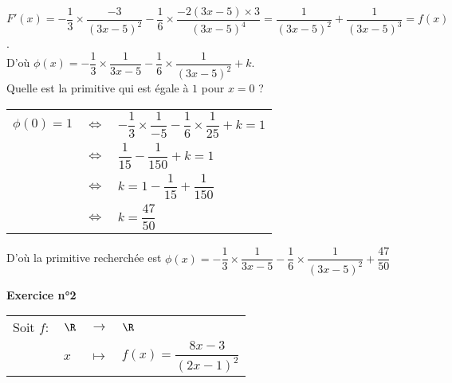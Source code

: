 $F'(x) = -\dfrac{1}{3} \times \dfrac{-3}{\left(3x-5\right)^2} - \dfrac{1}{6} \times \dfrac{-2\left(3x-5\right) \times 3}{\left(3x-5\right)^4} = \dfrac{1}{\left(3x-5\right)^2} + \dfrac{1}{\left(3x-5\right)^3} = f(x)$. \vspace*{.3cm} \\

D'où $\phi\left(x\right) = -\dfrac{1}{3} \times \dfrac{1}{3x-5} - \dfrac{1}{6} \times \dfrac{1}{\left(3x-5\right)^2} + k$. \vspace*{.3cm} \\

Quelle est la primitive qui est égale à $1$ pour $x = 0$ ? \\

\begin{tabular}{lll}
\hspace*{-.3cm} $\phi\left(0\right) = 1$ & $\Longleftrightarrow$ & $-\dfrac{1}{3} \times \dfrac{1}{-5} - \dfrac{1}{6} \times \dfrac{1}{25} + k = 1$ \vspace*{.3cm} \\
& $\Longleftrightarrow$ & $\dfrac{1}{15} - \dfrac{1}{150} + k = 1$ \vspace*{.3cm} \\
& $\Longleftrightarrow$ & $k = 1 - \dfrac{1}{15} + \dfrac{1}{150}$ \\
& $\Longleftrightarrow$ & $k = \dfrac{47}{50}$ \\
\end{tabular}

\vspace*{.3cm}

D'où la primitive recherchée est $\phi\left(x\right) = -\dfrac{1}{3} \times \dfrac{1}{3x-5} - \dfrac{1}{6} \times \dfrac{1}{\left(3x-5\right)^2} + \dfrac{47}{50}$

\vspace*{-5cm}

\newpage

\textbf{Exercice n°2} \\

\begin{tabular}{llll}
\hspace*{-.3cm} Soit $f:$ & $\R$ & $\longrightarrow$ & $\R$ \\
& $x$ & $\longmapsto$ & $f(x) = \dfrac{8x-3}{\left(2x-1\right)^2}$ \\
\end{tabular}

\vspace*{.3cm}

